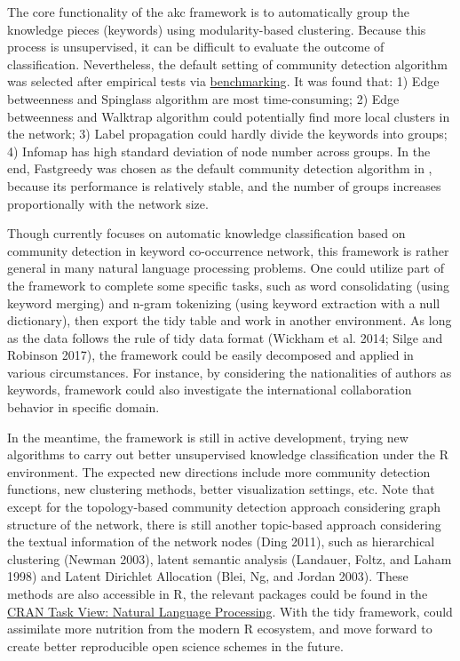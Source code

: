 The core functionality of the akc framework is to automatically group the knowledge pieces (keywords) using modularity-based clustering. Because this process is unsupervised, it can be difficult to evaluate the outcome of classification. Nevertheless, the default setting of community detection algorithm was selected after empirical tests via \href{https://cran.r-project.org/web/packages/akc/vignettes/Benchmarking.html}{benchmarking}. It was found that: 1) Edge betweenness and Spinglass algorithm are most time-consuming; 2) Edge betweenness and Walktrap algorithm could potentially find more local clusters in the network; 3) Label propagation could hardly divide the keywords into groups; 4) Infomap has high standard deviation of node number across groups. In the end, Fastgreedy was chosen as the default community detection algorithm in , because its performance is relatively stable, and the number of groups increases proportionally with the network size.

Though  currently focuses on automatic knowledge classification based on community detection in keyword co-occurrence network, this framework is rather general in many natural language processing problems. One could utilize part of the framework to complete some specific tasks, such as word consolidating (using keyword merging) and n-gram tokenizing (using keyword extraction with a null dictionary), then export the tidy table and work in another environment. As long as the data follows the rule of tidy data format (Wickham et al. 2014; Silge and Robinson 2017), the  framework could be easily decomposed and applied in various circumstances. For instance, by considering the nationalities of authors as keywords,  framework could also investigate the international collaboration behavior in specific domain.

In the meantime, the  framework is still in active development, trying new algorithms to carry out better unsupervised knowledge classification under the R environment. The expected new directions include more community detection functions, new clustering methods, better visualization settings, etc. Note that except for the topology-based community detection approach considering graph structure of the network, there is still another topic-based approach considering the textual information of the network nodes (Ding 2011), such as hierarchical clustering (Newman 2003), latent semantic analysis (Landauer, Foltz, and Laham 1998) and Latent Dirichlet Allocation (Blei, Ng, and Jordan 2003). These methods are also accessible in R, the relevant packages could be found in the \href{https://cran.r-project.org/web/views/NaturalLanguageProcessing.html}{CRAN Task View: Natural Language Processing}. With the tidy framework,  could assimilate more nutrition from the modern R ecosystem, and move forward to create better reproducible open science schemes in the future.

